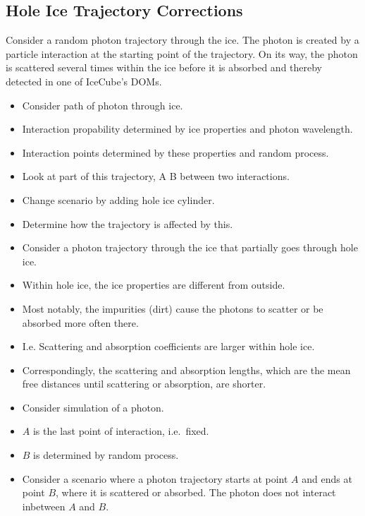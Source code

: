 \subsection{Hole Ice Trajectory
Corrections}\label{hole-ice-trajectory-corrections}

Consider a random photon trajectory through the ice. The photon is
created by a particle interaction at the starting point of the
trajectory. On its way, the photon is scattered several times within the
ice before it is absorbed and thereby detected in one of IceCube's DOMs.


\begin{itemize}
\item
  Consider path of photon through ice.
\item
  Interaction propability determined by ice properties and photon
  wavelength.
\item
  Interaction points determined by these properties and random process.
\item
  Look at part of this trajectory, A B between two interactions.
\item
  Change scenario by adding hole ice cylinder.
\item
  Determine how the trajectory is affected by this.
\item
  Consider a photon trajectory through the ice that partially goes
  through hole ice.
\item
  Within hole ice, the ice properties are different from outside.
\item
  Most notably, the impurities (dirt) cause the photons to scatter or be
  absorbed more often there.
\item
  I.e. Scattering and absorption coefficients are larger within hole
  ice.
\item
  Correspondingly, the scattering and absorption lengths, which are the
  mean free distances until scattering or absorption, are shorter.
\end{itemize}


\begin{itemize}
\tightlist
\item
  Consider simulation of a photon.
\item
  \(A\) is the last point of interaction, i.e.~fixed.
\item
  \(B\) is determined by random process.
\item
  Consider a scenario where a photon trajectory starts at point \(A\)
  and ends at point \(B\), where it is scattered or absorbed. The photon
  does not interact inbetween \(A\) and \(B\).
\end{itemize}

